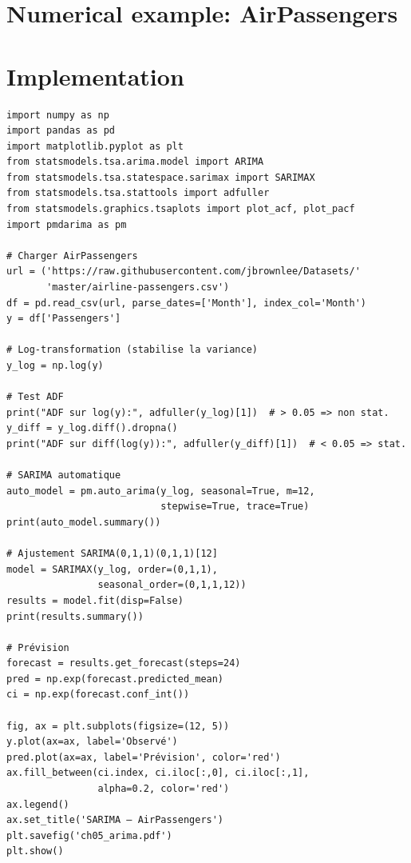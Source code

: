 \section{Numerical example: AirPassengers}

\begin{center}
\end{center}

\section{Implementation}

\begin{codeblock}[title=\textbf{Python}]
\begin{verbatim}
import numpy as np
import pandas as pd
import matplotlib.pyplot as plt
from statsmodels.tsa.arima.model import ARIMA
from statsmodels.tsa.statespace.sarimax import SARIMAX
from statsmodels.tsa.stattools import adfuller
from statsmodels.graphics.tsaplots import plot_acf, plot_pacf
import pmdarima as pm

# Charger AirPassengers
url = ('https://raw.githubusercontent.com/jbrownlee/Datasets/'
       'master/airline-passengers.csv')
df = pd.read_csv(url, parse_dates=['Month'], index_col='Month')
y = df['Passengers']

# Log-transformation (stabilise la variance)
y_log = np.log(y)

# Test ADF
print("ADF sur log(y):", adfuller(y_log)[1])  # > 0.05 => non stat.
y_diff = y_log.diff().dropna()
print("ADF sur diff(log(y)):", adfuller(y_diff)[1])  # < 0.05 => stat.

# SARIMA automatique
auto_model = pm.auto_arima(y_log, seasonal=True, m=12,
                           stepwise=True, trace=True)
print(auto_model.summary())

# Ajustement SARIMA(0,1,1)(0,1,1)[12]
model = SARIMAX(y_log, order=(0,1,1),
                seasonal_order=(0,1,1,12))
results = model.fit(disp=False)
print(results.summary())

# Prévision
forecast = results.get_forecast(steps=24)
pred = np.exp(forecast.predicted_mean)
ci = np.exp(forecast.conf_int())

fig, ax = plt.subplots(figsize=(12, 5))
y.plot(ax=ax, label='Observé')
pred.plot(ax=ax, label='Prévision', color='red')
ax.fill_between(ci.index, ci.iloc[:,0], ci.iloc[:,1],
                alpha=0.2, color='red')
ax.legend()
ax.set_title('SARIMA — AirPassengers')
plt.savefig('ch05_arima.pdf')
plt.show()
\end{verbatim}
\end{codeblock}

